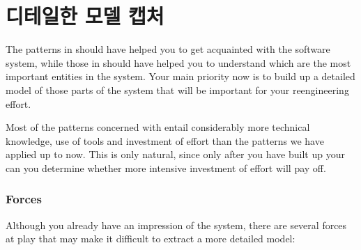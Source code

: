 \documentclass[a4paper,10pt,twoside]{book}
\begin{document}
	\renewcommand{\nnbb}[2]{} %
	\sloppy
\fi
\chapter{디테일한 모델 캡처}

The patterns in  should have helped you to get acquainted with the software system, while those in  should have helped you to understand which are the most important entities in the system. Your main priority now is to build up a detailed model of those parts of the system that will be important for your reengineering effort.

Most of the patterns concerned with  entail considerably more technical knowledge, use of tools and investment of effort than the patterns we have applied up to now. This is only natural, since only after you have built up your  can you determine whether more intensive investment of effort will pay off.

\subsection*{Forces}

Although you already have an impression of the system, there are several forces at play that may make it difficult to extract a more detailed model:
\end{document}
